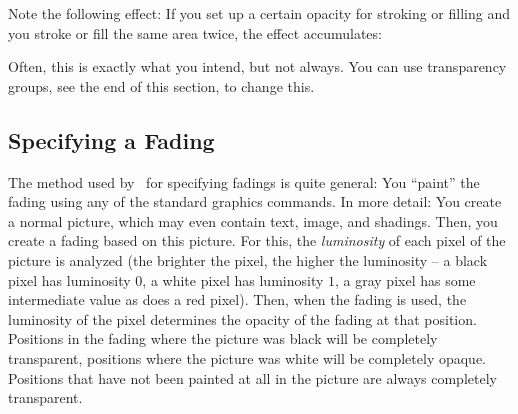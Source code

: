 Note the following effect: If you set up a certain opacity for stroking
or filling and you stroke or fill the same area twice, the effect
accumulates:

\begin{codeexample}[]
\end{codeexample}

Often, this is exactly what you intend, but not always. You can use
transparency groups, see the end of this section, to change this.


\subsection{Specifying a Fading}

The method used by \pgfname\ for specifying fadings is quite
general: You ``paint'' the fading using any of the standard graphics
commands. In more detail: You create a normal picture, which may even
contain text, image, and shadings. Then, you create a fading based on
this picture. For this, the \emph{luminosity} of each pixel of the
picture is analyzed (the brighter the pixel, the higher the luminosity
-- a black pixel has luminosity $0$, a white pixel has luminosity $1$,
a gray pixel has some intermediate value as does a red pixel). Then,
when the fading is used, the luminosity of the pixel determines the
opacity of the fading at that position. Positions in the fading where
the picture was black will be completely transparent, positions where
the picture was white will be completely opaque. Positions that have
not been painted at all in the picture are always completely
transparent.


